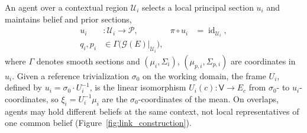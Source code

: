 \documentclass[twoside,11pt]{article}
\begin{document}
An agent over a contextual region \(\mathcal U_i\) selects a local principal section \(u_i\) and maintains belief and prior sections,
\begin{equation}
\begin{aligned}
u_i&:\mathcal U_i\longrightarrow\mathcal P,
&\pi\circ u_i&=\operatorname{id}_{\mathcal U_i},\\
q_i,p_i&\in\Gamma\bigl(\mathcal G(E)|_{\mathcal U_i}\bigr),
\end{aligned}
\label{eq:agent_bundle_sections}
\end{equation}
where \(\Gamma\) denotes smooth sections and \((\mu_i,\Sigma_i)\), \((\mu_{p,i},\Sigma_{p,i})\) are coordinates in \(u_i\). Given a reference trivialization \(\sigma_0\) on the working domain, the frame \(U_i\), defined by \(u_i=\sigma_0\cdot U_i^{-1}\), is the linear isomorphism \(U_i(c):\mathsf V\to E_c\) from \(\sigma_0\)- to \(u_i\)-coordinates, so \(\xi_i=U_i^{-1}\mu_i\) are the \(\sigma_0\)-coordinates of the mean. On overlaps, agents may hold different beliefs at the same context, not local representatives of one common belief (Figure~\ref{fig:link_construction}).
\end{document}
